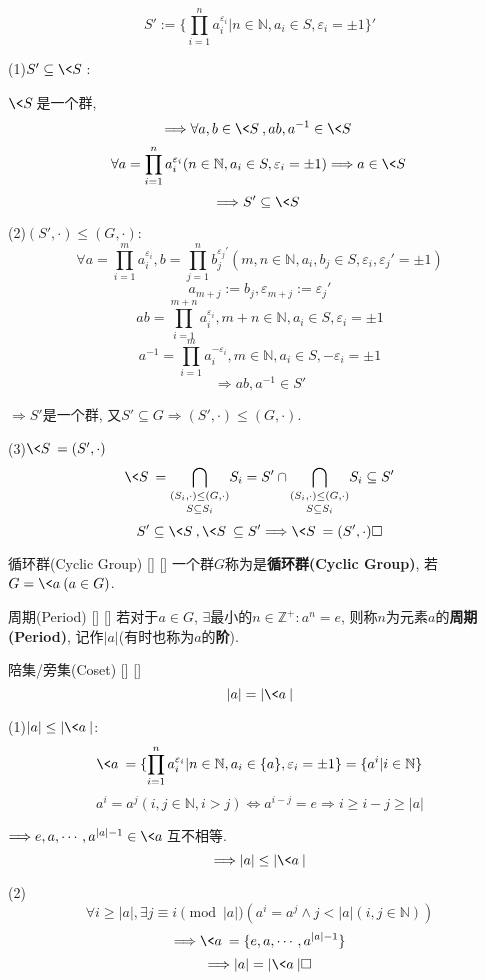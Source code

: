 \documentclass[UTF8]{ctexart}
\begin{document}
		\begin{prf}
			\[S':=\{\prod_{i=1}^{n}a_{i}^{\varepsilon_{i}}|n\in\mathbb{N},a_{i}\in S,\varepsilon_{i}=\pm 1\}'\]
			
			(1)$S'\subseteq \<S\>$: 
			
			$\<S\>$是一个群, 
			\[\Longrightarrow \forall a,b\in \<S\>, ab,a^{-1}\in \<S\>\]
			\[\forall a=\prod_{i=1}^{n}a_{i}^{\varepsilon_{i}}(n\in\mathbb{N},a_{i}\in S,\varepsilon_{i}=\pm 1)\Longrightarrow a\in \<S\>\]
			\[\Longrightarrow S'\subseteq \<S\>\]
			
			(2)$(S',\cdot)\leq (G,\cdot)$: 
			\[\forall a=\prod_{i=1}^{m}a_{i}^{\varepsilon_{i}},b=\prod_{j=1}^{n}b_{j}^{\varepsilon_{j}'}(m,n\in\mathbb{N},a_{i},b_{j}\in S,\varepsilon_{i},\varepsilon_{j}'=\pm 1)\]
			\[a_{m+j}:=b_{j},\varepsilon_{m+j}:=\varepsilon_{j}'\]
			\[ab=\prod_{i=1}^{m+n}a_{i}^{\varepsilon_{i}},m+n\in\mathbb{N},a_{i}\in S,\varepsilon_{i}=\pm 1\]
			\[a^{-1}=\prod_{i=1}^{m}a_{i}^{-\varepsilon_{i}},m\in\mathbb{N},a_{i}\in S,-\varepsilon_{i}=\pm 1\]
			\[\Longrightarrow ab,a^{-1}\in S'\]
			
			$\Longrightarrow S'$是一个群, 又$S'\subseteq G\Longrightarrow (S',\cdot)\leq (G,\cdot)$. 
			
			(3)$\<S\>=(S',\cdot)$
			\[\<S\>=\underset{S\subseteq S_{i}}{\bigcap_{(S_{i},\cdot)\leq (G,\cdot)}}S_{i}=S'\cap\underset{S\subseteq S_{i}}{\bigcap_{(S_{i},\cdot)\leq (G,\cdot)}}S_{i}\subseteq S'\]
			\[S'\subseteq \<S\>, \<S\>\subseteq S'\Longrightarrow \<S\>=(S',\cdot)\square\]
	\end{prf}
 
		\begin{dfn}
            []
            {循环群(Cyclic Group)}
            []
            []
			一个群$G$称为是\textbf{循环群(Cyclic Group)}, 若$G=\<a\>(a\in G)$. 
		\end{dfn}
			
		\begin{dfn}
            []
            {周期(Period)}
            []
            []
			若对于$a\in G$, $\exists$最小的$n\in \mathbb{Z}^{+}: a^{n}=e$, 则称$n$为元素$a$的\textbf{周期(Period)}, 记作$|a|$(有时也称为$a$的\textbf{阶}). 
		\end{dfn}
		
		\begin{ppt}
            []
            {陪集/旁集(Coset)}
            []
            []
			\[|a|=|\<a\>|\]
		\end{ppt}
		
	\begin{prf}		
			(1)$|a|\leq |\<a\>|$: 
			\[\<a\>=\{\prod_{i=1}^{n}a_{i}^{\varepsilon_{i}}|n\in\mathbb{N},a_{i}\in \{a\},\varepsilon_{i}=\pm 1\}=\{a^{i}|i\in \mathbb{N}\}\]		
			\[a^{i}=a^{j}(i,j\in \mathbb{N},i>j)\iff a^{i-j}=e\Longrightarrow i\geq i-j\geq |a|\]
			
			$\Longrightarrow e,a,\cdots,a^{|a|-1}\in \<a\>$互不相等. 
			\[\Longrightarrow |a|\leq |\<a\>|\]
			
			(2)
			\[\forall i\geq |a|,\exists j\equiv i\pmod{|a|} (a^{i}=a^{j}\wedge j<|a|(i,j\in\mathbb{N}))\]
			\[\Longrightarrow \<a\>=\{e,a,\cdots ,a^{|a|-1}\}\]
			\[\Longrightarrow |a|=|\<a\>|\square\]
		\end{prf}
  
\end{document}
